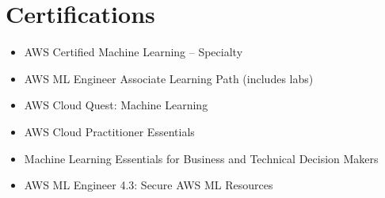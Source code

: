 \documentclass[letterpaper,11pt]{article}
\newcommand{\resumeItem}[1]{\item\small{#1\vspace{-2pt}}}
\newcommand{\resumeSubHeadingListStart}{\begin{itemize}[leftmargin=0.15in,label={}]}
\newcommand{\resumeSubHeadingListEnd}{\end{itemize}}
\begin{document}
\section{Certifications}
\resumeSubHeadingListStart
  \resumeItem{AWS Certified Machine Learning -- Specialty}
  \resumeItem{AWS ML Engineer Associate Learning Path (includes labs)}
  \resumeItem{AWS Cloud Quest: Machine Learning}
  \resumeItem{AWS Cloud Practitioner Essentials}
  \resumeItem{Machine Learning Essentials for Business and Technical Decision Makers}
  \resumeItem{AWS ML Engineer 4.3: Secure AWS ML Resources}
\resumeSubHeadingListEnd
\end{document}
